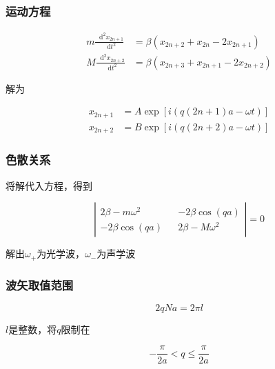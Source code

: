 \documentclass{article}
\newcommand*{\md}{\mathop{}\!\mathrm{d}}
\begin{document}
\begin{multicols}{2}
\subsubsection{运动方程}

\begin{equation*}
  \begin{aligned}
    m \frac{\md^2 x_{2n+1}}{\md t^2} &= \beta \left( x_{2n+2} + x_{2n} - 2 x_{2n+1} \right) \\
    M \frac{\md^2 x_{2n+2}}{\md t^2} &= \beta \left( x_{2n+3} + x_{2n+1} - 2 x_{2n+2} \right)
  \end{aligned}
\end{equation*}

解为

\begin{equation*}
  \begin{aligned}
    x_{2n+1} &= A \exp \left[ i \left( q \left( 2n+1 \right)a-\omega t \right) \right] \\
    x_{2n+2} &= B \exp \left[ i \left( q \left( 2n+2 \right)a-\omega t \right) \right]
  \end{aligned}
\end{equation*}

\subsubsection{色散关系}

将解代入方程，得到

\begin{equation*}
  \left|
    \begin{aligned}
      2\beta - m \omega^2 && -2\beta \cos \left( qa \right) \\
      -2\beta \cos \left( qa \right) && 2\beta -M\omega^2
    \end{aligned}
  \right| =0 
\end{equation*}

解出$\omega_+$为光学波，$\omega_-$为声学波

\subsubsection{波矢取值范围}

\begin{equation*}
  2qNa=2\pi l
\end{equation*}

$l$是整数，将$q$限制在

\begin{equation*}
  - \frac{\pi}{2a} < q \leq \frac{\pi}{2a}
\end{equation*}


\end{multicols}
\end{document}
